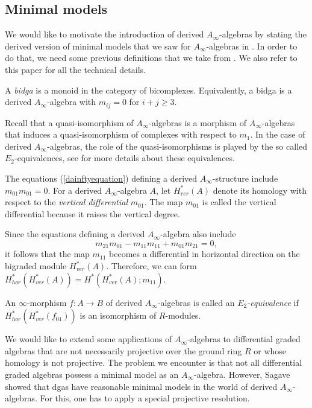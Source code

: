 \documentclass[Thesis.tex]{subfiles}
\begin{document}
\subsection{Minimal models}\label{derivedminimalmodels}


We would like to motivate the introduction of derived $A_\infty$-algebras by stating the derived version of minimal models that we saw for $A_\infty$-algebras in . In order to do that, we need some previous definitions that we take from \cite{sagave}. We also refer to this paper for all the technical details.

\begin{defin}
A \emph{bidga} is a monoid in the category of bicomplexes. Equivalently, a bidga is a derived $A_\infty$-algebra with $m_{ij} = 0$ for $i + j \geq 3$.
\end{defin}

Recall that a quasi-isomorphism of $A_\infty$-algebras is a morphism of $A_\infty$-algebras that induces a quasi-isomorphism of complexes with respect to $m_1$. In the case of derived $A_\infty$-algebras, the role of the quasi-isomorphisms is played by the so called $E_2$-equivalences, see \cite{spectral} for more details about these equivalences.

\begin{remark}
The equations (\ref{dainftyequation}) defining a derived $A_\infty$-structure include $m_{01}m_{01} = 0$. For a derived $A_\infty$-algebra
$A$, let $H^*_{ver}(A)$ denote its homology with respect to the \emph{vertical differential} $m_{01}$.
The map $m_{01}$ is called the vertical differential because it raises the vertical degree.

Since the equations defining a derived $A_\infty$-algebra also include
\[
m_{21}m_{01} - m_{11}m_{11} + m_{01}m_{21} = 0,
\]
it follows that the map $m_{11}$ becomes a differential in horizontal direction on the bigraded
module $H^*_{ver}(A)$. Therefore, we can form $H^*_{hor}(H^*_{ver}(A)) = H^*(H^*_{ver}(A);m_{11})$.
\end{remark}

\begin{defin}
An $\infty$-morphism $f : A \to B$ of derived $A_\infty$-algebras
is called an \emph{$E_2$-equivalence} if $H^*_{hor}(H^*_{ver}(f_{01}))$
is an isomorphism of $R$-modules.
\end{defin}

We would like to extend some applications of $A_\infty$-algebras to differential graded
algebras that are not necessarily projective over the ground ring $R$ or whose homology
is not projective. The problem we encounter is that not all differential graded algebras
possess a minimal model as an $A_\infty$-algebra. However, Sagave showed that dgas have
reasonable minimal models in the world of derived $A_\infty$-algebras. 
For this, one has to apply a special projective resolution.
\end{document}
